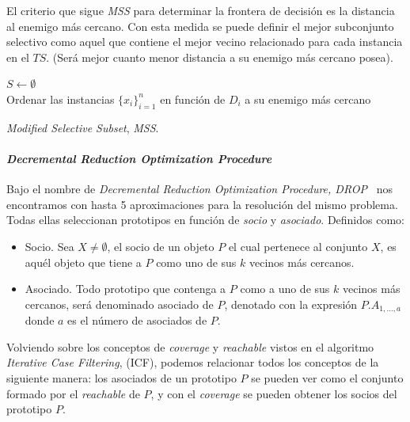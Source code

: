 El criterio que sigue \textit{MSS} para determinar la frontera de decisión es la distancia al enemigo más cercano. Con esta medida se puede definir el mejor subconjunto selectivo como aquel que contiene el mejor vecino relacionado para cada instancia en el $TS$. (Será mejor cuanto menor distancia a su enemigo más cercano posea).

\begin{algorithm}[H]
  	\BlankLine
  $S \leftarrow \emptyset$\\  	
  Ordenar las instancias $\lbrace x_i \rbrace^{n}_{i=1}$ en función de $D_i$ a su enemigo más cercano\\
	\caption{\textit{Modified Selective Subset}, \textit{MSS}.}\label{alg:Barandela-MSS}
\end{algorithm}

\paragraph{\textit{Decremental Reduction Optimization Procedure}}\label{paragraph:DROP}
\hfill \break
Bajo el nombre de \textit{Decremental Reduction Optimization Procedure, DROP}~\cite{wilson2000reduction} nos encontramos con hasta 5 aproximaciones para la resolución del mismo problema. Todas ellas seleccionan prototipos en función de \textit{socio} y \textit{asociado}. Definidos como:
\begin{itemize}
\item Socio. Sea $X \not= \emptyset$, el socio de un objeto $P$ el cual pertenece al conjunto $X$, es aquél objeto que tiene a $P$ como uno de sus $k$ vecinos más cercanos.
\item Asociado. Todo prototipo que contenga a $P$ como a uno de sus $k$ vecinos más cercanos, será denominado asociado de $P$, denotado con la expresión $P.A_{1,\dots,a}$ donde $a$ es el número de asociados de $P$.
\end{itemize}

Volviendo sobre los conceptos de \textit{coverage} y \textit{reachable} vistos en el algoritmo \textit{Iterative Case Filtering}, (ICF), podemos relacionar todos los conceptos de la siguiente manera: los asociados de un prototipo $P$ se pueden ver como el conjunto formado por el \textit{reachable} de $P$, y con el \textit{coverage} se pueden obtener los socios del prototipo $P$.

